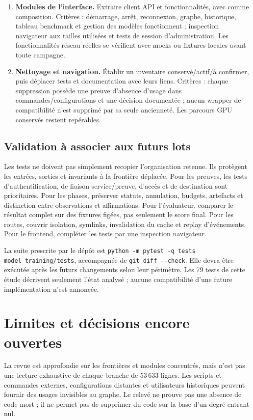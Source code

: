 \documentclass[11pt,a4paper]{article}
\newcommand{\code}[1]{{\ttfamily\path{#1}}}
\newcommand{\cmd}[1]{\texttt{#1}}
\begin{document}
\begin{enumerate}[label=\textbf{\arabic*.}]
\item \textbf{Modules de l'interface.}
Extraire client API et fonctionnalités, avec \code{app.js} comme composition.
Critères : démarrage, arrêt, reconnexion, graphe, historique, tableau benchmark
et gestion des modèles fonctionnent ; inspection navigateur aux tailles
utilisées et tests de session d'administration. Les fonctionnalités réseau
réelles se vérifient avec mocks ou fixtures locales avant toute campagne.

\item \textbf{Nettoyage et navigation.}
Établir un inventaire conservé/actif/à confirmer, puis déplacer tests et
documentation avec leurs liens. Critères : chaque suppression possède une
preuve d'absence d'usage dans commandes/configurations et une décision
documentée ; aucun wrapper de compatibilité n'est supprimé par sa seule
ancienneté. Les parcours GPU conservés restent repérables.
\end{enumerate}

\subsection{Validation à associer aux futurs lots}
Les tests ne doivent pas simplement recopier l'organisation retenue.
Ils protègent les entrées, sorties et invariants à la frontière déplacée.
Pour les preuves, les tests d'authentification, de liaison service/preuve,
d'accès et de destination sont prioritaires. Pour les phases, préserver
statuts, annulation, budgets, artefacts et distinction entre observations et
affirmations. Pour l'évaluateur, comparer le résultat complet sur des fixtures
figées, pas seulement le score final. Pour les routes, couvrir isolation,
symlinks, invalidation du cache et replay d'événements. Pour le frontend,
compléter les tests par une inspection navigateur.

La suite prescrite par le dépôt est
\cmd{python -m pytest -q tests model\_training/tests}, accompagnée de
\cmd{git diff {-}{-}check}. Elle devra être exécutée après les futurs changements
selon leur périmètre. Les 79 tests de cette étude décrivent seulement l'état
analysé ; aucune compatibilité d'une future implémentation n'est annoncée.

\section{Limites et décisions encore ouvertes}
La revue est approfondie sur les frontières et modules concentrés, mais
n'est pas une lecture exhaustive de chaque branche de 53\,633 lignes.
Les scripts et commandes externes, configurations distantes et utilisateurs
historiques peuvent fournir des usages invisibles au graphe. Le relevé ne
prouve pas une absence de code mort ; il ne permet pas de supprimer du code
sur la base d'un degré entrant nul.
\end{document}
